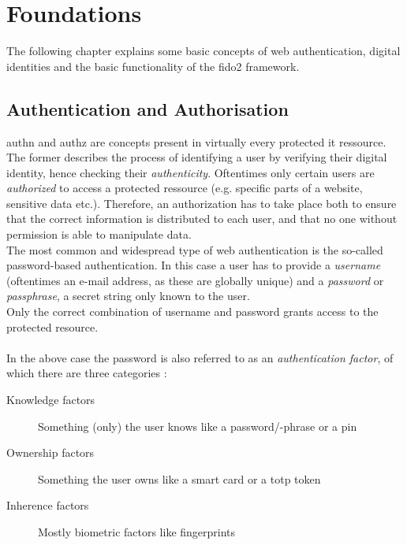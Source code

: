 
\section{Foundations}
\label{sec:foundations}

The following chapter explains some basic concepts of web authentication, digital identities and the basic functionality of the \ac{fido2} framework.

\subsection{Authentication and Authorisation}
\label{subsec:authn_authz}

\ac{authn} and \ac{authz} are concepts present in virtually every protected \ac{it} ressource.
The former describes the process of identifying a user by verifying their digital identity, hence checking their \emph{authenticity}. Oftentimes only certain users are \emph{authorized} to access a protected ressource (e.g. specific parts of a website, sensitive data etc.). Therefore, an authorization has to take place both to ensure that the correct information is distributed to each user, and that no one without permission is able to manipulate data.\\
The most common and widespread type of web authentication is the so-called password-based authentication. In this case a user has to provide a \emph{username} (oftentimes an e-mail address, as these are globally unique) and a \emph{password} or \emph{passphrase}, a secret string only known to the user.\\
Only the correct combination of username and password grants access to the protected resource.\\
\\
In the above case the password is also referred to as an \emph{authentication factor}, of which there are three categories \cite{turner2016}:

\begin{description}
    \item[Knowledge factors] Something (only) the user knows like a password/-phrase or a \ac{pin}
    \item[Ownership factors] Something the user owns like a smart card or a \ac{totp} token
    \item[Inherence factors] Mostly biometric factors like fingerprints
\end{description}

